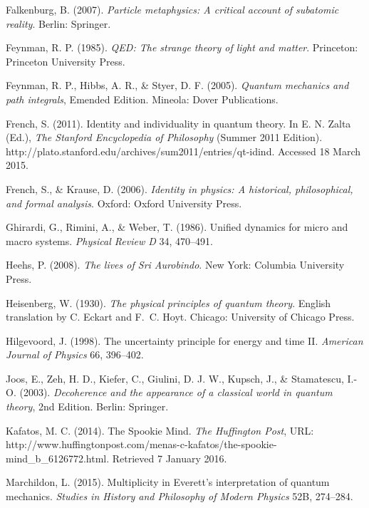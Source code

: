 \begin{thebibliography}{99}
Falkenburg, B. (2007). \emph{Particle metaphysics: A critical account of subatomic reality}. Berlin: Springer. 

Feynman, R. P. (1985). \emph{QED: The strange theory of light and matter}. Princeton: Princeton University Press. 

Feynman, R. P., Hibbs, A. R., \& Styer, D. F. (2005). \emph{Quantum mechanics and path integrals}, Emended Edition. Mineola: Dover Publications. 

French, S. (2011). Identity and individuality in quantum theory. In E. N. Zalta (Ed.), \emph{The Stanford Encyclopedia of Philosophy} (Summer 2011 Edition). http://plato.stanford.edu/archives/sum2011/entries/qt-idind. Accessed 18 March 2015.

French, S., \& Krause, D. (2006). \emph{Identity in physics: A historical, philosophical, and formal analysis}. Oxford: Oxford University Press. 

Ghirardi, G., Rimini, A., \& Weber, T. (1986). Unified dynamics for micro
and macro systems. \emph{Physical Review D} 34, 470--491.

Heehs, P. (2008). \emph{The lives of Sri Aurobindo}. New York: Columbia University Press.

Heisenberg, W. (1930). \emph{The physical principles of quantum theory}. English translation by C. Eckart and F.~C. Hoyt. Chicago: University of Chicago Press.

Hilgevoord, J. (1998). The uncertainty principle for energy and time II. \emph{American Journal of Physics} 66, 396--402.

Joos, E., Zeh, H. D., Kiefer, C., Giulini, D. J. W., Kupsch, J., \& Stamatescu, I.-O. (2003). \emph{Decoherence and the appearance of a classical world in quantum theory}, 2nd Edition. Berlin: Springer. 

Kafatos, M. C. (2014). The Spookie Mind. \emph{The Huffington Post}, URL: http://www.huffingtonpost.com/menas-c-kafatos/the-spookie-mind\_b\_6126772.html. Retrieved 7 January 2016.

Marchildon, L. (2015). Multiplicity in Everett's interpretation of quantum mechanics. \emph{Studies in History and Philosophy of Modern Physics} 52B, 274--284.


\end{thebibliography}
